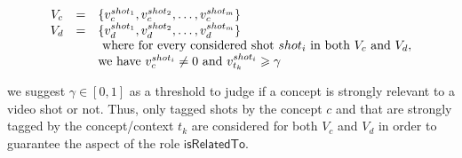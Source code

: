 		
		\begin{equation}
			\begin{array}{ c c l }
			V_{c} & = & \{v^{shot_{1}}_{c},v^{shot_{2}}_{c}, \dots, v^{shot_{m}}_{c}\}\\
			V_{d} & = & 
			\{v^{shot_{1}}_{d},v^{shot_{2}}_{d}, \dots, v^{shot_{m}}_{d}\}\\
			& & \text{ where for every considered shot } shot_{i} \text{ in both } V_{c} \text{ and } V_{d},\\
			& &  \text{we have } v^{shot_{i}}_{c}\neq 0 \text{ and } v^{shot_{i}}_{t_{k}} \geqslant \gamma
			\end{array}
		\end{equation}
		
		we suggest $\gamma \in [0,1]$  as a threshold to judge if a concept is strongly relevant 
		to a video shot or not. Thus, only tagged shots by the concept $c$ and that are strongly 
		tagged by the concept/context $t_{k}$ are considered for both $V_{c}$ and $V_{d}$ in order to guarantee 
		the  aspect of the role $\mathsf{isRelatedTo}$.


